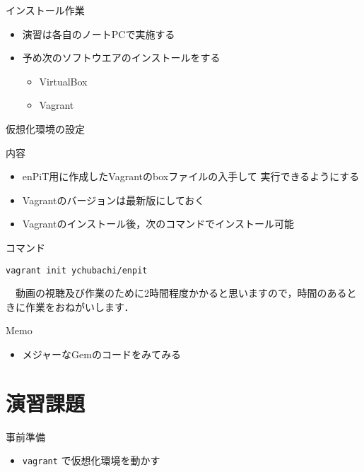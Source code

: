 \documentclass[t, aspectratio=169]{beamer}
\begin{document}
\begin{frame}[label=sec-1-1-4]{インストール作業}
\begin{itemize}
\item 演習は各自のノートPCで実施する
\item 予め次のソフトウエアのインストールをする
\begin{itemize}
\item VirtualBox
\item Vagrant
\end{itemize}
\end{itemize}
\end{frame}
\begin{frame}[fragile,label=sec-1-1-5]{仮想化環境の設定}
 \begin{block}{内容}
\begin{itemize}
\item enPiT用に作成したVagrantのboxファイルの入手して
実行できるようにする

\item Vagrantのバージョンは最新版にしておく

\item Vagrantのインストール後，次のコマンドでインストール可能
\end{itemize}
\end{block}
\begin{block}{コマンド}
\begin{verbatim}
vagrant init ychubachi/enpit
\end{verbatim}


　動画の視聴及び作業のために2時間程度かかると思いますので，時間のあるときに作業をおねがいします．
\end{block}
\end{frame}
\begin{frame}[label=sec-1-1-6]{Memo}
\begin{itemize}
\item メジャーなGemのコードをみてみる
\end{itemize}
\end{frame}

\section{演習課題}
\label{sec-1-2}
\begin{frame}[fragile,label=sec-1-2-1]{事前準備}
 \begin{itemize}
\item \texttt{vagrant} で仮想化環境を動かす
\end{itemize}
\end{frame}
\end{document}
